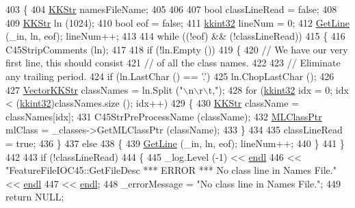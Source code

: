 \begin{DoxyCode}
403 \{
404   \hyperlink{class_k_k_b_1_1_k_k_str}{KKStr}  namesFileName;
405 
406  
407   \textcolor{keywordtype}{bool}  classLineRead = \textcolor{keyword}{false};
408 
409   \hyperlink{class_k_k_b_1_1_k_k_str}{KKStr}  ln (1024);
410   \textcolor{keywordtype}{bool}  eof = \textcolor{keyword}{false};
411   \hyperlink{namespace_k_k_b_a8fa4952cc84fda1de4bec1fbdd8d5b1b}{kkint32}  lineNum = 0;
412   \hyperlink{class_k_k_m_l_l_1_1_feature_file_i_o_a61ca11485d2c14368c1019bfcc53ab16}{GetLine} (\_in, ln, eof);  lineNum++;
413 
414   \textcolor{keywordflow}{while}  ((!eof)  &&  (!classLineRead))
415   \{
416     C45StripComments (ln);
417 
418     \textcolor{keywordflow}{if}  (!ln.Empty ())
419     \{
420       \textcolor{comment}{// We have our very first line,  this should consist }
421       \textcolor{comment}{// of all the class names.}
422 
423       \textcolor{comment}{// Eliminate any trailing period.}
424       \textcolor{keywordflow}{if}  (ln.LastChar () == \textcolor{charliteral}{'.'})
425         ln.ChopLastChar ();
426 
427       \hyperlink{class_k_k_b_1_1_vector_k_k_str}{VectorKKStr}  classNames = ln.Split (\textcolor{stringliteral}{"\(\backslash\)n\(\backslash\)r\(\backslash\)t,"});
428       \textcolor{keywordflow}{for}  (\hyperlink{namespace_k_k_b_a8fa4952cc84fda1de4bec1fbdd8d5b1b}{kkint32}  idx = 0;  idx < (\hyperlink{namespace_k_k_b_a8fa4952cc84fda1de4bec1fbdd8d5b1b}{kkint32})classNames.size ();   idx++)
429       \{
430         \hyperlink{class_k_k_b_1_1_k_k_str}{KKStr}  className = classNames[idx];
431         C45StrPreProcessName (className);
432         \hyperlink{class_k_k_m_l_l_1_1_m_l_class}{MLClassPtr}  mlClass = \_classes->GetMLClassPtr (className);
433       \}
434 
435       classLineRead = \textcolor{keyword}{true};
436     \}
437     \textcolor{keywordflow}{else}
438     \{
439       \hyperlink{class_k_k_m_l_l_1_1_feature_file_i_o_a61ca11485d2c14368c1019bfcc53ab16}{GetLine} (\_in, ln, eof);  lineNum++;
440     \}
441   \}
442 
443   \textcolor{keywordflow}{if}  (!classLineRead)
444   \{
445     \_log.Level (-1) << \hyperlink{namespace_k_k_b_ad1f50f65af6adc8fa9e6f62d007818a8}{endl}
446                    << \textcolor{stringliteral}{"FeatureFileIOC45::GetFileDesc  *** ERROR ***    No class line in Names File."} << 
      \hyperlink{namespace_k_k_b_ad1f50f65af6adc8fa9e6f62d007818a8}{endl}
447                    << \hyperlink{namespace_k_k_b_ad1f50f65af6adc8fa9e6f62d007818a8}{endl};
448     \_errorMessage = \textcolor{stringliteral}{"No class line in Names File."};
449     \textcolor{keywordflow}{return}  NULL;

\end{DoxyCode}
